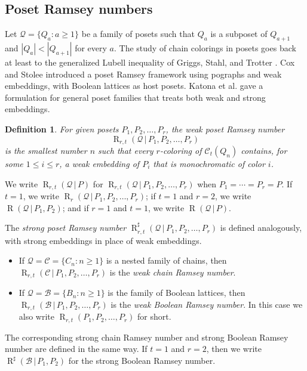 \documentclass[twoside,12pt]{article}
\newtheorem{definition}{Definition}[section]
\begin{document}
\subsection{Poset Ramsey numbers}

Let $\mathcal Q=\{Q_a:a\geq1\}$ be a family of posets such that $Q_a$ is a subposet of $Q_{a+1}$ and $|Q_a|<|Q_{a+1}|$ for every $a$. The study of chain colorings in posets goes back at least to the generalized Lubell inequality of Griggs, Stahl, and Trotter \cite{GST84}. Cox and Stolee \cite{CS18} introduced a poset Ramsey framework using pographs and weak embeddings, with Boolean lattices as host posets. Katona et al. \cite{KMOW25} gave a formulation for general poset families that treats both weak and strong embeddings.

\begin{definition}
For given posets $P_1,P_2,\ldots,P_r$, the \emph{weak poset Ramsey number}
\[
\operatorname{R}_{r,t}(\mathcal Q\,|\,P_1,P_2,\ldots,P_r)
\]
is the smallest number $n$ such that every $r$-coloring of $\mathcal C_t(Q_n)$ contains, for some $1\leq i\leq r$, a weak embedding of $P_i$ that is monochromatic of color $i$.
\end{definition}

We write $\operatorname{R}_{r,t}(\mathcal Q\,|\,P)$ for $\operatorname{R}_{r,t}(\mathcal Q\,|\,P_1,P_2,\ldots,P_r)$ when $P_1=\cdots=P_r=P$. If $t=1$, we write $\operatorname{R}_{r}(\mathcal Q\,|\,P_1,P_2,\ldots,P_r)$; if $t=1$ and $r=2$, we write $\operatorname{R}(\mathcal Q\,|\,P_1,P_2)$; and if $r=1$ and $t=1$, we write $\operatorname{R}(\mathcal Q\,|\,P)$.

The \emph{strong poset Ramsey number} $\operatorname{R}_{r,t}^{\sharp}(\mathcal Q\,|\,P_1,P_2,\ldots,P_r)$ is defined analogously, with strong embeddings in place of weak embeddings.

\begin{itemize}
\item If $\mathcal Q=\mathcal C=\{C_n:n\geq1\}$ is a nested family of chains, then $\operatorname{R}_{r,t}(\mathcal C\,|\,P_1,P_2,\ldots,P_r)$ is the \emph{weak chain Ramsey number}.
\item If $\mathcal Q=\mathcal B=\{B_n:n\geq1\}$ is the family of Boolean lattices, then $\operatorname{R}_{r,t}(\mathcal B\,|\,P_1,P_2,\ldots,P_r)$ is the \emph{weak Boolean Ramsey number}. In this case we also write $\operatorname{R}_{r,t}(P_1,P_2,\ldots,P_r)$ for short.
\end{itemize}

The corresponding strong chain Ramsey number and strong Boolean Ramsey number are defined in the same way. If $t=1$ and $r=2$, then we write $\operatorname{R}^{\sharp}(\mathcal B\,|\,P_1,P_2)$ for the strong Boolean Ramsey number.
\end{document}
